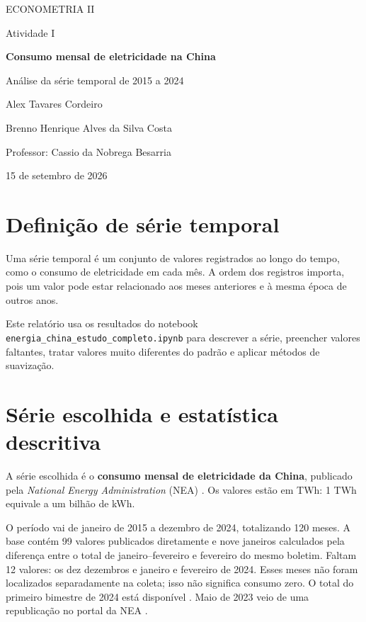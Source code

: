 \documentclass[11pt,a4paper]{article}
\begin{document}
\hypersetup{pageanchor=false}
\begin{titlepage}
\centering
{\large ECONOMETRIA II\par}
\vspace{1cm}
{\Large Atividade I\par}
\vspace{2cm}
{\LARGE\bfseries Consumo mensal de eletricidade na China\par}
\vspace{0.3cm}
{\Large Análise da série temporal de 2015 a 2024\par}
\vspace{2cm}
{\large Alex Tavares Cordeiro\par}
\vspace{0.25cm}
{\large Brenno Henrique Alves da Silva Costa\par}
\vspace{1.5cm}
{\large Professor: Cassio da Nobrega Besarria\par}
\vfill
{\large 15 de setembro de 2026\par}
\end{titlepage}
\hypersetup{pageanchor=true}


\section{Definição de série temporal}
Uma série temporal é um conjunto de valores registrados ao longo do tempo, como o consumo de eletricidade em cada mês. A ordem dos registros importa, pois um valor pode estar relacionado aos meses anteriores e à mesma época de outros anos.

Este relatório usa os resultados do notebook \texttt{energia\_china\_estudo\_completo.ipynb} para descrever a série, preencher valores faltantes, tratar valores muito diferentes do padrão e aplicar métodos de suavização.

\section{Série escolhida e estatística descritiva}
A série escolhida é o \textbf{consumo mensal de eletricidade da China}, publicado pela \textit{National Energy Administration} (NEA) \cite{neaArquivo,neaMensal}. Os valores estão em TWh: 1 TWh equivale a um bilhão de kWh.

O período vai de janeiro de 2015 a dezembro de 2024, totalizando 120 meses. A base contém 99 valores publicados diretamente e nove janeiros calculados pela diferença entre o total de janeiro--fevereiro e fevereiro do mesmo boletim. Faltam 12 valores: os dez dezembros e janeiro e fevereiro de 2024. Esses meses não foram localizados separadamente na coleta; isso não significa consumo zero. O total do primeiro bimestre de 2024 está disponível \cite{neaBimestre}. Maio de 2023 veio de uma republicação no portal da NEA \cite{neaMaio}.
\end{document}
